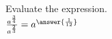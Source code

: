 \documentclass{ximera}
\author{David Kish}
\begin{document}
\begin{exercise}
Evaluate the expression.\\
$\frac{a^{\frac{3}{4}}}{a^{\frac{2}{3}}}=a^{\answer{\frac{1}{12}}}$
\end{exercise}
\end{document}
